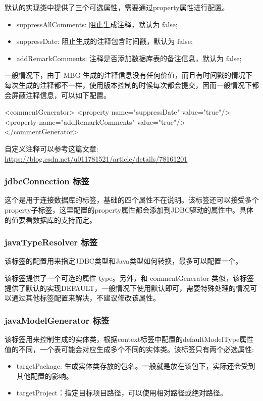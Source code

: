 默认的实现类中提供了三个可选属性，需要通过property属性进行配置。
\begin{itemize}
    \item suppressAllComments: 阻止生成注释，默认为 false;
    \item suppressDate: 阻止生成的注释包含时间戳，默认为 false;
    \item addRemarkComments: 注释是否添加数据库表的备注信息，默认为 false;
\end{itemize}

一般情况下，由于 MBG 生成的注释信息没有任何价值，而且有时间戳的情况下每次生成的注释都不一样，使用版本控制的时候每次都会提交，因而一般情况下都会屏蔽注释信息，可以如下配置。

\begin{xml}
<commentGenerator>
    <property name="suppressDate" value="true"/>
    <property name="addRemarkComments" value="true"/>
</commentGenerator>
\end{xml}

自定义注释可以参考这篇文章: \url{https://blog.csdn.net/u011781521/article/details/78161201}

\subsubsection*{jdbcConnection 标签}

这个是用于连接数据库的标签，基础的四个属性不在说明。该标签还可以接受多个property子标签，这里配置的property属性都会添加到JDBC驱动的属性中。具体的值要看数据库的支持而定。

\subsubsection*{javaTypeResolver 标签}

该标签的配置用来指定JDBC类型和Java类型如何转换，最多可以配置一个。

该标签提供了一个可选的属性 type。另外，和 commentGenerator 类似，该标签提供了默认的实现DEFAULT，一般情况下使用默认即可，需要特殊处理的情况可以通过其他标签配置来解决，不建议修改该属性。

\subsubsection*{javaModelGenerator 标签}

该标签用来控制生成的实体类，根据context标签中配置的defaultModelType属性值的不同，一个表可能会对应生成多个不同的实体类。该标签只有两个必选属性:
\begin{itemize}
    \item targetPackage: 生成实体类存放的包名。一般就是放在该包下，实际还会受到其他配置的影响。
    \item targetProject：指定目标项目路径，可以使用相对路径或绝对路径。
\end{itemize}

